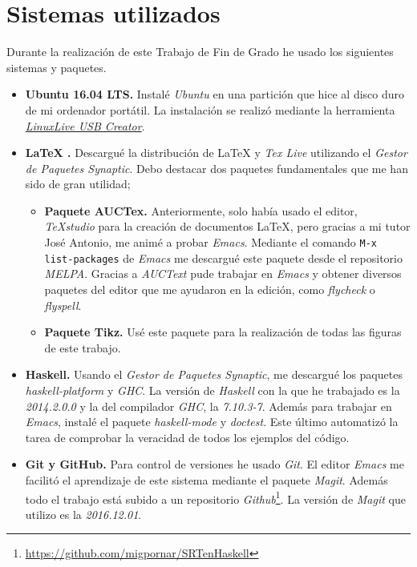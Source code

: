 \chapter*{Sistemas utilizados}

Durante la realización de este Trabajo de Fin de Grado he usado los
siguientes sistemas y paquetes. 

\begin{itemize}
\item \textbf{Ubuntu 16.04 LTS.} Instalé \textit{Ubuntu} en una
  partición que hice al disco duro de mi ordenador portátil. La
  instalación se realizó mediante la herramienta
  \href{http://www.linuxliveusb.com/} {\textit{LinuxLive USB
      Creator}}. 

\item \textbf{\LaTeX{} .} Descargué la distribución de \LaTeX{} y
  \textit{Tex Live} utilizando el \textit{Gestor de Paquetes
    Synaptic}. Debo destacar dos paquetes fundamentales que me han
  sido de gran utilidad;
  \begin{itemize}
  \item \textbf{Paquete AUCTex.} Anteriormente, solo había usado el
    editor, \textit{TeXstudio} para la creación de documentos
    \LaTeX{}, pero gracias a mi tutor José Antonio, me animé a probar
    \textit{Emacs}. Mediante el comando \texttt{M-x list-packages} de
    \textit{Emacs} me descargué este paquete desde el repositorio
    \textit{MELPA}. Gracias a \textit{AUCText} pude trabajar en
    \textit{Emacs} y obtener diversos paquetes del editor que me
    ayudaron en la edición, como \textit{flycheck} o
    \textit{flyspell}.

  \item \textbf{Paquete Tikz.} Usé este paquete para la realización de
    todas las figuras de este trabajo.
      
  \end{itemize}
 
\item \textbf{Haskell.} Usando el \textit{Gestor de Paquetes
    Synaptic}, me descargué los paquetes \textit{haskell-platform} y
  \textit{GHC}. La versión de \textit{Haskell} con la que he trabajado
  es la \textit{2014.2.0.0} y la del compilador \textit{GHC}, la
  \textit{7.10.3-7}. Además para trabajar en \textit{Emacs}, instalé
  el paquete \textit{haskell-mode} y \textit{doctest}. Este último
  automatizó la tarea de comprobar la veracidad de todos los ejemplos
  del código.

\item \textbf{Git y GitHub.} Para control de versiones he usado
  \textit{Git}. El editor \textit{Emacs} me facilitó el aprendizaje de
  este sistema mediante el paquete \textit{Magit}. Además todo el
  trabajo está subido a un repositorio
  \textit{Github}\footnote{\href{https://github.com/migpornar/SRTenHaskell}{https://github.com/migpornar/SRTenHaskell}}. La
  versión de \textit{Magit} que utilizo es la \textit{2016.12.01}.
  \end{itemize}

  